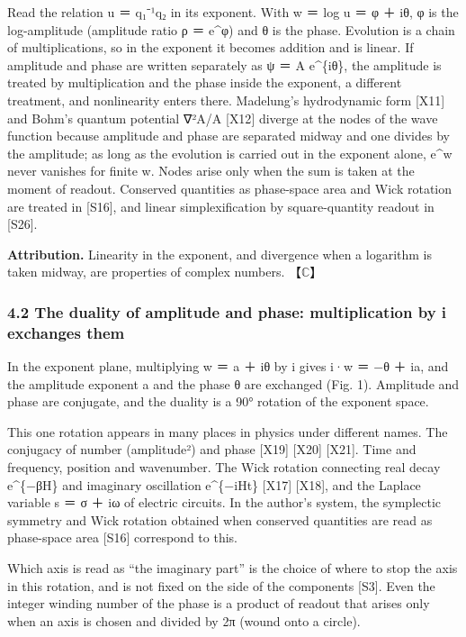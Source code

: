 \documentclass[
  a4paper,
]{article}
\begin{document}
Read the relation u ＝ q₁⁻¹q₂ in its exponent. With w ＝ log u ＝ φ ＋
iθ, φ is the log-amplitude (amplitude ratio ρ ＝ e\^{}φ) and θ is the
phase. Evolution is a chain of multiplications, so in the exponent it
becomes addition and is linear. If amplitude and phase are written
separately as ψ ＝ A e\^{}\{iθ\}, the amplitude is treated by
multiplication and the phase inside the exponent, a different treatment,
and nonlinearity enters there. Madelung's hydrodynamic form {[}X11{]}
and Bohm's quantum potential ∇²A/A {[}X12{]} diverge at the nodes of the
wave function because amplitude and phase are separated midway and one
divides by the amplitude; as long as the evolution is carried out in the
exponent alone, e\^{}w never vanishes for finite w. Nodes arise only
when the sum is taken at the moment of readout. Conserved quantities as
phase-space area and Wick rotation are treated in {[}S16{]}, and linear
simplexification by square-quantity readout in {[}S26{]}.

\textbf{Attribution.} Linearity in the exponent, and divergence when a
logarithm is taken midway, are properties of complex numbers.
【\(\mathbb{C}\)】

\subsubsection{4.2 The duality of amplitude and phase: multiplication by
i exchanges
them}\label{the-duality-of-amplitude-and-phase-multiplication-by-i-exchanges-them}

In the exponent plane, multiplying w ＝ a ＋ iθ by i gives i·w ＝ −θ ＋
ia, and the amplitude exponent a and the phase θ are exchanged (Fig. 1).
Amplitude and phase are conjugate, and the duality is a 90° rotation of
the exponent space.

This one rotation appears in many places in physics under different
names. The conjugacy of number (amplitude²) and phase {[}X19{]}
{[}X20{]} {[}X21{]}. Time and frequency, position and wavenumber. The
Wick rotation connecting real decay e\^{}\{−βH\} and imaginary
oscillation e\^{}\{−iHt\} {[}X17{]} {[}X18{]}, and the Laplace variable
s ＝ σ ＋ iω of electric circuits. In the author's system, the
symplectic symmetry and Wick rotation obtained when conserved quantities
are read as phase-space area {[}S16{]} correspond to this.

Which axis is read as ``the imaginary part'' is the choice of where to
stop the axis in this rotation, and is not fixed on the side of the
components {[}S3{]}. Even the integer winding number of the phase is a
product of readout that arises only when an axis is chosen and divided
by 2π (wound onto a circle).
\end{document}
